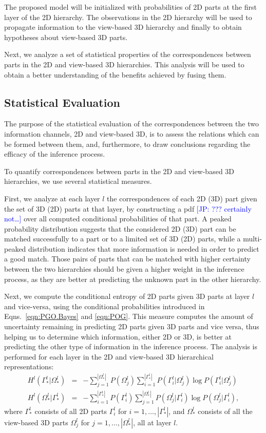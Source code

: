 \documentclass[runningheads]{llncs}
\newcommand{\commentJP}[1]{\textcolor{blue}{[JP: #1]}}
\begin{document}
The proposed model will be initialized with probabilities of 2D parts at the first layer of the 2D hierarchy. The observations in the 2D hierarchy will be used to propagate information to the view-based 3D hierarchy and finally to obtain hypotheses about view-based 3D parts. 

Next, we analyze a set of statistical properties of the correspondences between parts in the 2D and view-based 3D hierarchies. This analysis will be used to obtain a better understanding of the benefits achieved by fusing them.

\subsection{Statistical Evaluation}
\label{sec:statistical}

The purpose of the statistical evaluation of the correspondences between the two information channels, 2D and view-based 3D, is to assess the relations which can be formed between them, and, furthermore, to draw conclusions regarding the efficacy of the inference process. 

To quantify correspondences between parts in the 2D and view-based 3D hierarchies, we use several statistical measures.

First, we analyze at each layer $l$ the correspondences of each 2D (3D) part given the set of 3D (2D) parts at that layer, by constructing a pdf \commentJP{??? certainly not\dots} over all computed conditional probabilities of that part. A peaked probability distribution suggests that the considered 2D (3D) part can be matched successfully to a part or to a limited set of 3D (2D) parts, while a multi-peaked distribution indicates that more information is needed in order to predict a good match. Those pairs of parts that can be matched with higher certainty between the two hierarchies should be given a higher weight in the inference process, as they are better at predicting the unknown part in the other hierarchy.

Next, we compute the conditional entropy of 2D parts given 3D parts at layer $l$ and vice-versa, using the conditional probabilities introduced in Eqns.~\ref{eqn:PGO.Bayes} and \ref{eqn:POG}. This measure computes the amount of uncertainty remaining in predicting 2D parts given 3D parts and vice versa, thus helping us to determine which information, either 2D or 3D, is better at predicting the other type of information in the inference process. The analysis is performed for each layer in the 2D and view-based 3D hierarchical representations:
\begin{eqnarray}
 H^l(\Gamma_*^l|\Omega_*^l) &=& -\sum\limits_{j=1}^{|\Omega_*^l|}P({\Omega_j^l})\sum\limits_{i=1}^{|\Gamma_*^l|}P(\Gamma_i^l|\Omega_j^l)\log P(\Gamma_i^l|\Omega_j^l) \\
 H^l(\Omega_*^l|\Gamma_*^l) &=& -\sum\limits_{i=1}^{|\Gamma_*^l|}P({\Gamma_i^l})\sum\limits_{j=1}^{|\Omega_*^l|}P(\Omega_j^l|\Gamma_i^l)\log P(\Omega_j^l|\Gamma_i^l),
\end{eqnarray}
where $\Gamma_*^l$ consists of all 2D parts $\Gamma_i^l$ for $i=1,\ldots,|\Gamma_*^l|$, and $\Omega_*^l$ consists of all the view-based 3D parts $\Omega_j^l$ for $j=1,\ldots,|\Omega_*^l|$, all at layer $l$.
\end{document}
